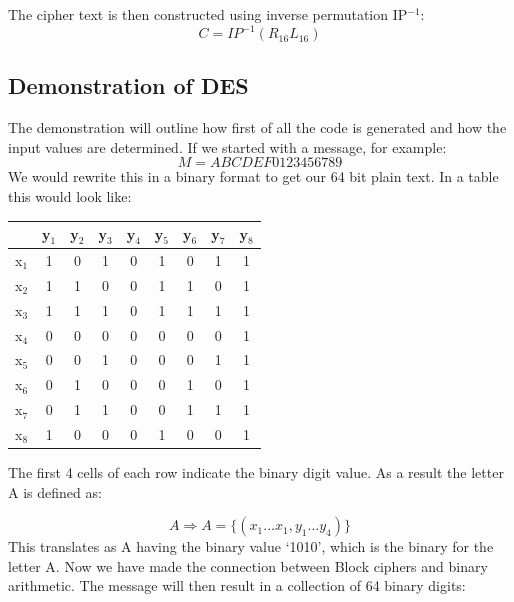 \documentclass[11pt,a4paper]{report}
\begin{document}
The cipher text is then constructed using inverse permutation IP$^{-1}$:
\begin{displaymath}
C = IP^{-1}(R_{16}L_{16})
\end{displaymath}

\subsection{Demonstration of DES}
\label{subsec: DemoDES}

The demonstration will outline how first of all the code is generated and how the input values are determined. If we started with a message, for example:
\begin{displaymath}
M = ABCDEF0123456789
\end{displaymath}
We would rewrite this in a binary format to get our 64 bit plain text. In a table this would look like: \newline

\begin{center}
\begin{tabular}{ |c|c|c|c|c|c|c|c|c| }
\hline
  {} & y$_{1}$ & y$_{2}$ & y$_{3}$ & y$_{4}$ & y$_{5}$ & y$_{6}$ & y$_{7}$ & y$_{8}$ \\ \hline
  x$_{1}$ & 1 & 0 & 1 & 0 & 1 & 0 & 1 & 1 \\ \hline
  x$_{2}$ & 1 & 1 & 0 & 0 & 1 & 1 & 0 & 1 \\ \hline
  x$_{3}$ & 1 & 1 & 1 & 0 & 1 & 1 & 1 & 1 \\ \hline
  x$_{4}$ & 0 & 0 & 0 & 0 & 0 & 0 & 0 & 1 \\ \hline
  x$_{5}$ & 0 & 0 & 1 & 0 & 0 & 0 & 1 & 1 \\ \hline
  x$_{6}$ & 0 & 1 & 0 & 0 & 0 & 1 & 0 & 1 \\ \hline
  x$_{7}$ & 0 & 1 & 1 & 0 & 0 & 1 & 1 & 1 \\ \hline
  x$_{8}$ & 1 & 0 & 0 & 0 & 1 & 0 & 0 & 1 \\ \hline
\end{tabular}
\end{center}

The first 4 cells of each row indicate the binary digit value. As a result the letter A is defined as:

\begin{displaymath}
A \Rightarrow A = \{(x_{1}...x_{1}, y_{1}...y_{4})\}
\end{displaymath}
This translates as A having the binary value `1010', which is the binary for the letter A. Now we have made the connection between Block ciphers and binary arithmetic. The message will then result in a collection of 64 binary digits:
\end{document}
